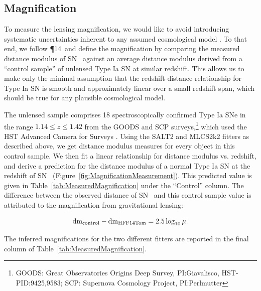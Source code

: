 \subsection{Magnification}
\label{sec:Magnification}

To measure the lensing magnification, we would like to avoid
introducing systematic uncertainties inherent to any assumed
cosmological model \citep[e.g.][]{Nordin:2014}.  To that end, we
follow \P14\ and define the magnification by comparing
the measured distance modulus of SN \tomas\ against an average
distance modulus derived from a ``control sample'' of unlensed Type Ia
SN at similar redshift.  This allows us to make only the minimal
assumption that the redshift-distance relationship for Type Ia SN is
smooth and approximately linear over a small redshift span, which
should be true for any plausible cosmological model.

The unlensed sample comprises 18 spectroscopically confirmed Type Ia
SNe in the range $1.14\leq z \leq1.42$ from the GOODS and SCP
surveys,\footnote{GOODS: Great Observatories Origins Deep Survey,
PI:Giavalisco, HST-PID:9425,9583; SCP: Supernova Cosmology Project,
PI:Perlmutter} which used the HST Advanced Camera for
Surveys \citep{Riess:2006,Suzuki:2012}.  Using the SALT2 and MLCS2k2
fitters as described above, we get distance modulus measures for every
object in this control sample.  We then fit a linear relationship for
distance modulus vs. redshift, and derive a prediction for the
distance modulus of a normal Type Ia SN at the redshift of SN \tomas\
(Figure~\ref{fig:MagnificationMeasurement}).
This predicted value is given in
Table~\ref{tab:MeasuredMagnification} under the ``Control'' column.
The difference between the observed distance of SN \tomas\ and this
control sample value is attributed to the magnification from
gravitational lensing:

\begin{equation} \label{eqn:mu}
{\rm dm}_{\rm control} - {\rm dm}_{\rm HFF14Tom} = 2.5 \log_{10}\mu.
\end{equation}

\noindent The inferred magnifications for the two different fitters are
reported in the final column of Table~\ref{tab:MeasuredMagnification}.

